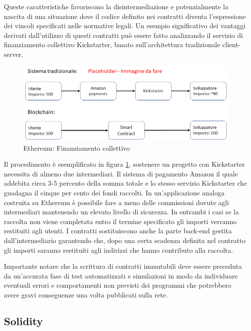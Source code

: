 Queste caratteristiche favoriscono la disintermediazione e potenzialmente la nascita di una situazione dove il codice definito nei contratti diventa l’espressione dei vincoli specificati nelle normative legali. Un esempio significativo dei vantaggi derivati dall'utilizzo di questi contratti può essere fatto analizzando il servizio  di finanziamento collettivo Kickstarter, basato sull'architettura tradizionale client-server.
\\
\begin{figure}[H]
\centering
\includegraphics[width=1\textwidth]{immagini/kickstarter.png}
\caption{Ethereum: Finanziamento collettivo}
\label{fig:Kickstarter}
\end{figure}

Il procedimento è esemplificato in figura \ref{fig:Kickstarter}, sostenere un progetto con Kickstarter necessita di almeno due intermediari. Il sistema di pagamento Amazon il quale addebita circa 3-5 percento della somma totale e lo stesso servizio Kickstarter che guadagna il cinque per cento dei fondi raccolti. In un'applicazione analoga costruita su Ethereum è possibile fare a meno delle commissioni dovute agli intermediari mantenendo un elevato livello di sicurezza. In entrambi i casi se la raccolta non viene completata entro il termine specificato gli importi verranno restituiti agli utenti. I contratti sostituiscono anche la parte back-end gestita dall'intermediario garantendo che, dopo una certa scadenza definita nel contratto gli importi saranno restituiti agli indirizzi che hanno contributo alla raccolta. 

Importante notare che la scrittura di contratti immutabili deve essere preceduta da un’accurata fase di test automatizzati e simulazioni in modo da individuare eventuali errori e comportamenti non previsti dei programmi che potrebbero avere gravi conseguenze una volta pubblicati sulla rete.

\subsection{Solidity}


